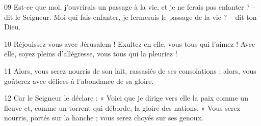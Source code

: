 
09 Est-ce que moi, j’ouvrirais un passage à la vie, et je ne ferais pas enfanter ? – dit le Seigneur. Moi qui fais enfanter, je fermerais le passage de la vie ? – dit ton Dieu.

10 Réjouissez-vous avec Jérusalem ! Exultez en elle, vous tous qui l’aimez ! Avec elle, soyez pleins d’allégresse, vous tous qui la pleuriez !

11 Alors, vous serez nourris de son lait, rassasiés de ses consolations ; alors, vous goûterez avec délices à l’abondance de sa gloire.

12 Car le Seigneur le déclare : « Voici que je dirige vers elle la paix comme un fleuve et, comme un torrent qui déborde, la gloire des nations. » Vous serez nourris, portés sur la hanche ; vous serez choyés sur ses genoux.
